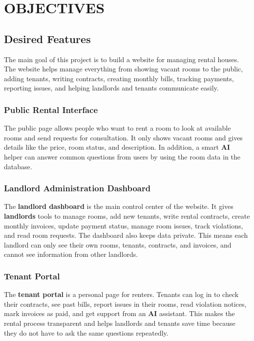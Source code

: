 \chapter{OBJECTIVES}

\section{Desired Features}
The main goal of this project is to build a website for managing rental houses. The website helps manage everything from showing vacant rooms to the public, adding tenants, writing contracts, creating monthly bills, tracking payments, reporting issues, and helping landlords and tenants communicate easily.

\subsection{Public Rental Interface}
The public page allows people who want to rent a room to look at available rooms and send requests for consultation. It only shows vacant rooms and gives details like the price, room status, and description. In addition, a smart \textbf{AI} helper can answer common questions from users by using the room data in the database.

\subsection{Landlord Administration Dashboard}
The \textbf{landlord dashboard} is the main control center of the website. It gives \textbf{landlords} tools to manage rooms, add new tenants, write rental contracts, create monthly invoices, update payment status, manage room issues, track violations, and read room requests. The dashboard also keeps data private. This means each landlord can only see their own rooms, tenants, contracts, and invoices, and cannot see information from other landlords.

\subsection{Tenant Portal}
The \textbf{tenant portal} is a personal page for renters. Tenants can log in to check their contracts, see past bills, report issues in their rooms, read violation notices, mark invoices as paid, and get support from an \textbf{AI} assistant. This makes the rental process transparent and helps landlords and tenants save time because they do not have to ask the same questions repeatedly.

